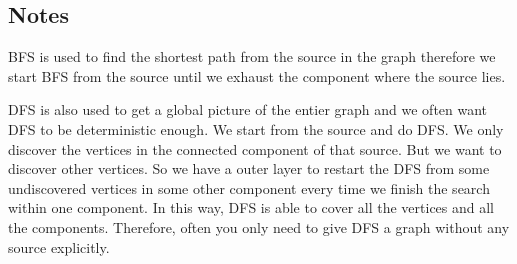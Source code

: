 \documentclass[en,hazy,blue,screen,14pt]{elegantnote}
\begin{document}
\subsection{Notes}
BFS is used to find the shortest path from the source in the graph therefore we 
start BFS from the source until we exhaust the component where the source lies.

DFS is also used to get a global picture of the entier graph and we often want 
DFS to be deterministic enough. We start from the source and do DFS. We only 
discover the vertices in the connected component of that source. But we want to 
discover other vertices. So we have a outer layer to restart the DFS from some 
undiscovered vertices in some other component every time we finish the search 
within one component. In this way, DFS is able to cover all the vertices and 
all the components. Therefore, often you only need to give DFS a graph without 
any source explicitly.
\end{document}
